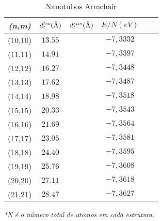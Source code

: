 \documentclass[12pt,a4paper]{article}
\author{Antonio Lívio}
\newcommand{\angstrom}{\textup{\AA}}
\begin{document}
\begin{table}[h]
\centering
\caption{Nanotubos Armchair}
\begin{tabular}{|c|c|c|c|c|c|}
\hline
 
\textit{(n,m)} & $d_{t}^{teo}(\angstrom)$ & $d_{t}^{sim}(\angstrom)$ & $E/N(eV)$ \\ 
\hline 

(10,10) & $13.55$ &  & $-7,3332$ \\ 
\hline
 
(11,11) & $14.91$ &  & $-7,3397$ \\ 
\hline
 
(12,12) & $16.27$ &  & $-7,3448$ \\ 
\hline
 
(13,13) & $17.62$ &  & $-7,3487$ \\ 
\hline
 
(14,14) & $18.98$ &  & $-7,3518$ \\ 
\hline
 
(15,15) & $20.33$ &  & $-7,3543$ \\ 
\hline
 
(16,16) & $21.69$ &  & $-7,3564$ \\ 
\hline
 
(17,17) & $23.05$ &  & $-7,3581$ \\ 
\hline
 
(18,18) & $24.40$ &  & $-7,3595$ \\ 
\hline

(19,19) & $25.76$ &  & $-7,3608$ \\ 
\hline

(20,20) & $27.11$ &  & $-7,3618$ \\ 
\hline

(21,21) & $28.47$ &  & $-7,3627$ \\ 
\hline

 
\end{tabular} 
\end{table}
\emph{*N é o número total de atomos em cada estrutura.}
\end{document}
